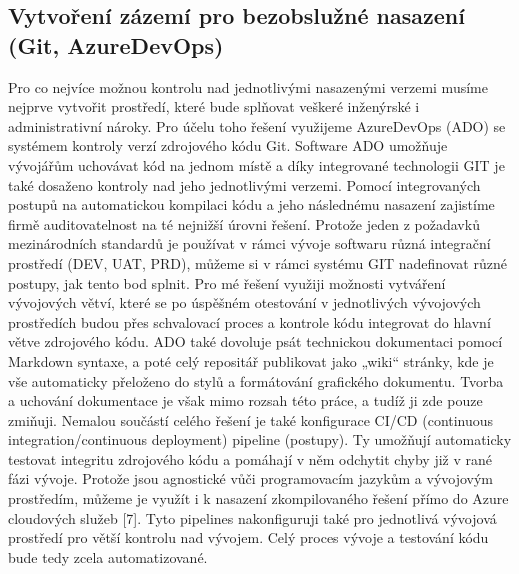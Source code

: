 \documentclass[12pt]{article}
\begin{document}
\begin{sloppypar}
\begin{spacing}{1.15}
        \subsection*{Vytvoření zázemí pro bezobslužné nasazení (Git, AzureDevOps)}
        Pro co nejvíce možnou kontrolu nad jednotlivými nasazenými verzemi
        musíme nejprve vytvořit prostředí, které bude splňovat veškeré
        inženýrské i administrativní nároky. Pro účelu toho řešení využijeme
        AzureDevOps (ADO) se systémem kontroly verzí zdrojového kódu Git.
        Software ADO umožňuje vývojářům uchovávat kód na jednom místě a díky
        integrované technologii GIT je také dosaženo kontroly nad jeho
        jednotlivými verzemi. Pomocí integrovaných postupů na automatickou
        kompilaci kódu a jeho následnému nasazení zajistíme firmě
        auditovatelnost na té nejnižší úrovni řešení. Protože jeden z požadavků
        mezinárodních standardů je používat v rámci vývoje softwaru různá
        integrační prostředí (DEV, UAT, PRD), můžeme si v rámci systému GIT
        nadefinovat různé postupy, jak tento bod splnit. Pro mé řešení využiji
        možnosti vytváření vývojových větví, které se po úspěšném otestování v
        jednotlivých vývojových prostředích budou přes schvalovací proces a
        kontrole kódu integrovat do hlavní větve zdrojového kódu. ADO také
        dovoluje psát technickou dokumentaci pomocí Markdown syntaxe, a poté
        celý repositář publikovat jako „wiki“ stránky, kde je vše automaticky
        přeloženo do stylů a formátování grafického dokumentu. Tvorba a uchování
        dokumentace je však mimo rozsah této práce, a tudíž ji zde pouze
        zmiňuji. Nemalou součástí celého řešení je také konfigurace CI/CD
        (continuous integration/continuous deployment) pipeline (postupy). Ty
        umožňují automaticky testovat integritu zdrojového kódu a pomáhají v něm
        odchytit chyby již v rané fázi vývoje. Protože jsou agnostické vůči
        programovacím jazykům a vývojovým prostředím, můžeme je využít i k
        nasazení zkompilovaného řešení přímo do Azure cloudových služeb [7].
        Tyto pipelines nakonfiguruji také pro jednotlivá vývojová prostředí pro
        větší kontrolu nad vývojem. Celý proces vývoje a testování kódu bude
        tedy zcela automatizované.


\end{spacing}
\end{sloppypar}
\end{document}
